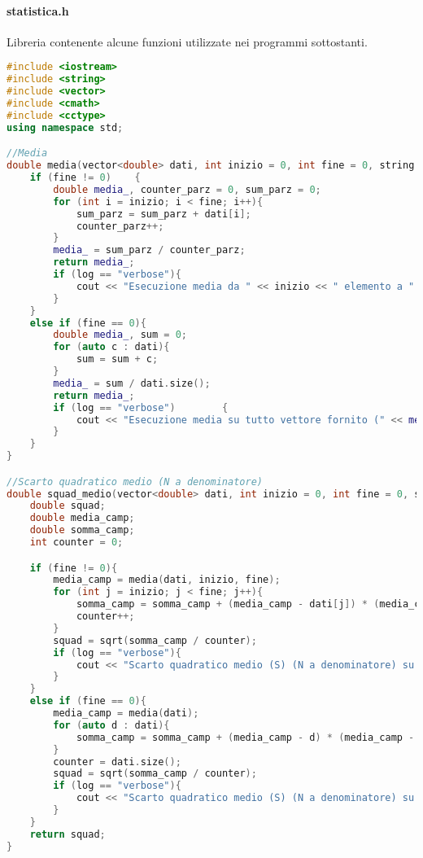 \documentclass[a4paper,11pt,oneside]{article}
\begin{document}
\paragraph{statistica.h} Libreria contenente alcune funzioni utilizzate nei programmi sottostanti.
\begin{lstlisting}[language=C++, label=lst:statistica.h, caption=statistica.h]
#include <iostream>
#include <string>
#include <vector>
#include <cmath>
#include <cctype>
using namespace std;

//Media
double media(vector<double> dati, int inizio = 0, int fine = 0, string log = ""){
    if (fine != 0)    {
        double media_, counter_parz = 0, sum_parz = 0;
        for (int i = inizio; i < fine; i++){
            sum_parz = sum_parz + dati[i];
            counter_parz++;
        }
        media_ = sum_parz / counter_parz;
        return media_;
        if (log == "verbose"){
            cout << "Esecuzione media da " << inizio << " elemento a " << fine << "su vettore fornito" << endl;
        }
    }
    else if (fine == 0){
        double media_, sum = 0;
        for (auto c : dati){
            sum = sum + c;
        }
        media_ = sum / dati.size();
        return media_;
        if (log == "verbose")        {
            cout << "Esecuzione media su tutto vettore fornito (" << media_ << ")" << endl;
        }
    }
}

//Scarto quadratico medio (N a denominatore)
double squad_medio(vector<double> dati, int inizio = 0, int fine = 0, string log = ""){
    double squad;
    double media_camp;
    double somma_camp;
    int counter = 0;

    if (fine != 0){
        media_camp = media(dati, inizio, fine);
        for (int j = inizio; j < fine; j++){
            somma_camp = somma_camp + (media_camp - dati[j]) * (media_camp - dati[j]);
            counter++;
        }
        squad = sqrt(somma_camp / counter);
        if (log == "verbose"){
            cout << "Scarto quadratico medio (S) (N a denominatore) su parte del vettore (" << squad << ")" << endl;
        }
    }
    else if (fine == 0){
        media_camp = media(dati);
        for (auto d : dati){
            somma_camp = somma_camp + (media_camp - d) * (media_camp - d);
        }
        counter = dati.size();
        squad = sqrt(somma_camp / counter);
        if (log == "verbose"){
            cout << "Scarto quadratico medio (S) (N a denominatore) su tutto il vettore (" << squad << ")" << endl;
        }
    }
    return squad;
}


\end{lstlisting}
\end{document}
